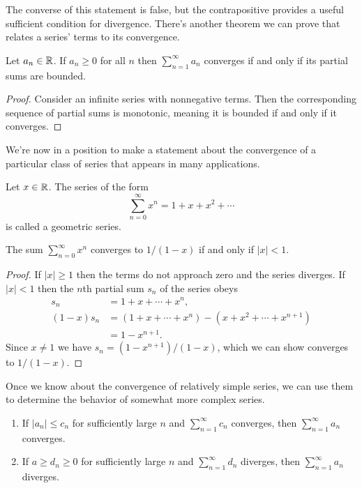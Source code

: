 \documentclass[../m131main.tex]{subfiles}
\begin{document}
The converse of this statement is false, but the contrapositive provides a useful sufficient condition for divergence.
There's another theorem we can prove that relates a series' terms to its convergence.

\begin{theorem}
    Let $a_n \in \mathbb{R}$.
    If $a_n \geq 0$ for all $n$ then $\sum_{n=1}^{\infty} a_n$ converges if and only if its partial sums are bounded.
\end{theorem}

\begin{proof}
    Consider an infinite series with nonnegative terms.
    Then the corresponding sequence of partial sums is monotonic, meaning it is bounded if and only if it converges.
\end{proof}

We're now in a position to make a statement about the convergence of a particular class of series that appears in many applications.

\begin{definition}
    Let $x \in \mathbb{R}$.
    The series of the form
    \[ \sum_{n=0}^{\infty} x^{n} = 1 + x + x^2 + \cdots \]
    is called a geometric series.
\end{definition}

\begin{theorem}
    The sum $\sum_{n=0}^{\infty} x^{n}$ converges to $1 / (1-x)$ if and only if $|x| < 1$.
\end{theorem}

\begin{proof}
    If $|x| \geq 1$ then the terms do not approach zero and the series diverges.
    If $|x| < 1$ then the $n$th partial sum $s_n$ of the series obeys
    \begin{align*}
        s_n &= 1 + x + \cdots + x^{n}, \\
        (1-x)s_n &= (1 + x + \cdots + x^{n}) - (x + x^2 + \cdots + x^{n+1}) \\
        &= 1 - x^{n+1}.
    \end{align*}
    Since $x \neq 1$ we have $s_n = (1 - x^{n+1}) / (1-x)$, which we can show converges to $1 / (1 - x)$.
\end{proof}

Once we know about the convergence of relatively simple series, we can use them to determine the behavior of somewhat more complex series.

\begin{theorem}
    \begin{enumerate}[label=(\alph*)]
        \item If $|a_n| \leq c_n$ for sufficiently large $n$ and $\sum_{n=1}^{\infty}c_n$ converges, then $\sum_{n=1}^{\infty}a_n$ converges.
        \item If $a \geq d_n \geq 0$ for sufficiently large $n$ and $\sum_{n=1}^{\infty}d_n$ diverges, then $\sum_{n=1}^{\infty}a_n$ diverges.
    \end{enumerate}
\end{theorem}
\end{document}
